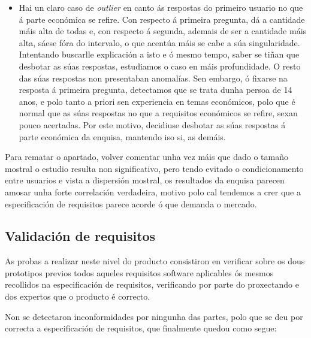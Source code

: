   \begin{itemize}
   \item Hai un claro caso de \textit{outlier} en canto ás respostas do
         primeiro usuario no que á parte económica se refire. Con respecto á
         primeira pregunta, dá a cantidade máis alta de todas e, con respecto á
         segunda, ademais de ser a cantidade máis alta, sáese fóra do
         intervalo, o que acentúa máis se cabe a súa singularidade. Intentando
         buscarlle explicación a isto e ó mesmo tempo, saber se tiñan que
         desbotar as súas respostas, estudiamos o caso en máis profundidade. O
         resto das súas respostas non presentaban anomalías. Sen embargo, ó
         fixarse na resposta á primeira pregunta, detectamos que se trata dunha
         persoa de 14 anos, e polo tanto a priori sen experiencia en temas
         económicos, polo que é normal que as súas respostas no que a
         requisitos económicos se refire, sexan pouco acertadas. Por este
         motivo, decidiuse desbotar as súas respostas á parte económica da
         enquisa, mantendo iso si, as demáis.
  \end{itemize}

 Para rematar o apartado, volver comentar unha vez máis que dado o tamaño
 mostral o estudio resulta non significativo, pero tendo evitado o
 condicionamento entre usuarios e vista a dispersión mostral, os resultados da
 enquisa parecen amosar unha forte correlación verdadeira, motivo polo cal
 tendemos a crer que a especificación de requisitos parece acorde ó que demanda
 o mercado.

 \subsection{Validación de requisitos}

 As probas a realizar neste nivel do producto consistiron en verificar sobre os
 dous prototipos previos todos aqueles requisitos software aplicables ós mesmos
 recollidos na especificación de requisitos, verificando por parte do
 proxectando e dos expertos que o producto é correcto.

 Non se detectaron inconformidades por ningunha das partes, polo que se deu por
 correcta a especificación de requisitos, que finalmente quedou como segue:

